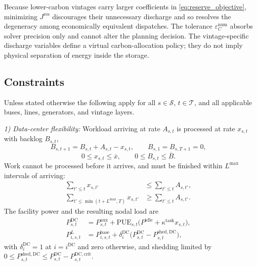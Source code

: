 \documentclass[journal]{IEEEtran}
\begin{document}
Because lower-carbon vintages carry larger coefficients in
\eqref{eq:reserve_objective}, minimizing $J^{\mathrm{res}}$ discourages
their unnecessary discharge and so resolves the degeneracy among
economically equivalent dispatches. The tolerance
$\varepsilon_C^{\mathrm{num}}$ absorbs solver precision only and cannot
alter the planning decision. The vintage-specific discharge variables
define a virtual carbon-allocation policy; they do not imply physical
separation of energy inside the storage.

\subsection{Constraints}
\label{sec:constraints}

Unless stated otherwise the following apply for all $s\in\mathcal{S}$,
$t\in\mathcal{T}$, and all applicable buses, lines, generators, and
vintage layers.

\emph{1) Data-center flexibility:}
Workload arriving at rate $A_{s,t}$ is processed at rate $x_{s,t}$ with
backlog $B_{s,t}$,
\begin{equation}
B_{s,t+1}=B_{s,t}+A_{s,t}-x_{s,t},
\qquad
B_{s,1}=B_{s,T+1}=0,
\label{eq:backlog_dynamic}
\end{equation}
\begin{equation}
0\leq x_{s,t}\leq\overline{x},
\qquad
0\leq B_{s,t}\leq\overline{B}.
\label{eq:workload_limits}
\end{equation}
Work cannot be processed before it arrives, and must be finished within
$L^{\max}$ intervals of arriving:
\begin{align}
\sum_{t'\leq t}x_{s,t'}
&\leq
\sum_{t'\leq t}A_{s,t'},
\label{eq:no_early_processing}\\
\sum_{t'\leq\min(t+L^{\max},T)}\!\!\!\!x_{s,t'}
&\geq
\sum_{t'\leq t}A_{s,t'}.
\label{eq:deadline_constraint}
\end{align}
The facility power and the resulting nodal load are
\begin{align}
P_{s,t}^{\mathrm{DC}}
&=
P_{s,t}^{\mathrm{aux}}
+\mathrm{PUE}_{s,t}
\bigl(P^{\mathrm{idle}}+\kappa^{\mathrm{task}}x_{s,t}\bigr),
\label{eq:DC_power}\\
P_{i,s,t}^{L}
&=
P_{i,s,t}^{\mathrm{base}}
+\delta_i^{\mathrm{DC}}
\bigl(P_{s,t}^{\mathrm{DC}}-P_{s,t}^{\mathrm{shed,DC}}\bigr),
\label{eq:nodal_load}
\end{align}
with $\delta_i^{\mathrm{DC}}=1$ at $i=i^{\mathrm{DC}}$ and zero
otherwise, and shedding limited by
$0\leq P_{s,t}^{\mathrm{shed,DC}}\leq
P_{s,t}^{\mathrm{DC}}-P_{s,t}^{\mathrm{DC,crit}}$.
\end{document}
